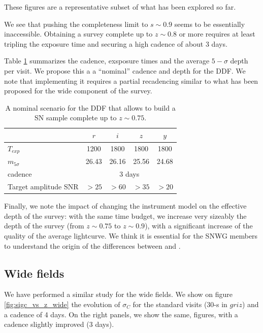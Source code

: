 \documentclass[\docopts]{\docclass}
\begin{document}
These figures are a representative subset of what has been explored so far. 

We see that pushing the completeness limit to $s \sim 0.9$ seems to be
essentially inaccessible.  Obtaining a survey complete up to $z \sim
0.8$ or more requires at least tripling the exposure time and securing
a high cadence of about 3 days.

Table \ref{tab:nominal_scenario_DDF} summarizes the cadence, exsposure
times and the average $5-\sigma$ depth per visit. We propose this a a
``nominal'' cadence and depth for the DDF. We note that implementing
it requires a partial recadencing similar to what has been proposed
for the wide component of the survey.

\begin{table}[t]
\begin{center}
\caption{A nominal scenario for the DDF that allows to build a SN
  sample complete up to $z \sim 0.75$.}
\label{tab:nominal_scenario_DDF}
\begin{tabular}{l|cccc}
\hline
\hline
              & $r$ & $i$ & $z$ & $y$ \\
\hline 
$T_{exp}$      & 1200 & 1800 & 1800 & 1800 \\
$m_{5\sigma}$  & 26.43    & 26.16    &  25.56    &  24.68   \\
cadence       &  \multicolumn{4}{c}{3 days} \\
Target amplitude SNR & $>25$ & $>60$ & $>35$ & $>20$ \\
\hline
\end{tabular}
\end{center}
\end{table}

Finally, we note the impact of changing the instrument model on the
effective depth of the survey: with the same time budget, we increase
very sizeably the depth of the survey (from $z \sim 0.75$ to $z\sim
0.9$), with a significant increase of the quality of the average
lightcurve.  We think it is essential for the SNWG members to
understand the origin of the differences between \cite{LSE-40} and
\cite{SMTN-002}.


\subsection{Wide fields}

We have performed a similar study for the wide fields. We show on
figure \ref{fig:sigc_vs_z_wide} the evolution of
$\sigma_C$ for the standard visits (30-s in $griz$) and a cadence of 4
days. On the right panels, we show the same, figures, with a cadence
slightly improved (3 days).
\end{document}
